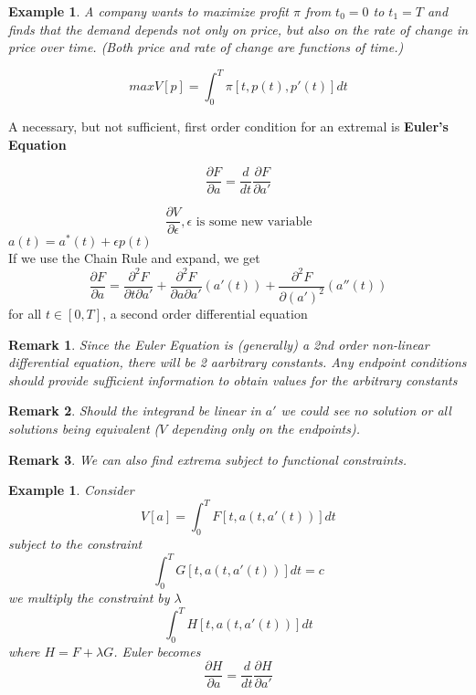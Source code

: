 \documentclass[12pt]{article}
\theoremstyle{plain}
\newtheorem*{remark}{Remark}
\newtheorem{example}[theorem]{Example}
\theoremstyle{definition}
\begin{document}
\begin{example}
	A company wants to maximize profit $\pi$ from $t_0 = 0$ to $t_1 = T$ and finds that the demand depends not only on price, but also on the rate of change in price over time. (Both price and rate of change are functions of time.)

	$$max V[p]=\int^T_0 \pi[t, p(t), p'(t)]dt$$
\end{example}

A necessary, but not sufficient, first order condition for an extremal is \textbf{Euler's Equation}

$$\frac{\partial F}{\partial a} = \frac{d}{dt} \frac{\partial F}{\partial a'}$$

$$\frac{\partial V}{\partial \epsilon}, \epsilon \text{ is some new variable}$$
$a(t) = a^* (t) + \epsilon p(t)$\\

If we use the Chain Rule and expand, we get
$$\frac{\partial F}{\partial a} = \frac{\partial^2 F}{\partial t \partial a'} + \frac{\partial^2 F}{\partial a \partial a'}(a'(t)) + \frac{\partial^2 F}{\partial (a')^2}(a''(t))$$
for all $t\in [0,T]$, a second order differential equation

\begin{remark}
	Since the Euler Equation is (generally) a 2nd order non-linear differential equation, there will be 2 aarbitrary constants. Any endpoint conditions should provide sufficient information to obtain values for the arbitrary constants
\end{remark}

\begin{remark}
	Should the integrand be linear in $a'$ we could see no solution or all solutions being equivalent ($V$ depending only on the endpoints).
\end{remark}

\begin{remark}
	We can also find extrema subject to functional constraints.
\end{remark}

\begin{example}
	Consider
	$$V[a]=\int^T_0 F[t, a(t, a'(t))]dt$$
	subject to the constraint
	$$\int^T_0 G[t, a(t, a'(t))]dt = c$$
	we multiply the constraint by $\lambda$
	$$\int^T_0 H[t, a(t, a'(t))]dt$$
	where $H = F + \lambda G$. Euler becomes
	$$\frac{\partial H}{\partial a} = \frac{d}{dt} \frac{\partial H}{\partial a'}$$
\end{example}
\end{document}
